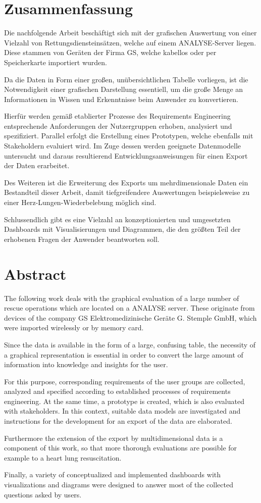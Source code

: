 \newpage\thispagestyle{empty}
\section*{Zusammenfassung}

Die nachfolgende Arbeit beschäftigt sich mit der grafischen Auswertung von einer Vielzahl von Rettungsdiensteinsätzen, welche auf einem \acrlong{ANALYSE}-Server liegen.
Diese stammen von Geräten der Firma \acrlong{GS}, welche kabellos oder per Speicherkarte importiert wurden.

Da die Daten in Form einer großen, unübersichtlichen Tabelle vorliegen, ist die Notwendigkeit einer grafischen Darstellung essentiell, um die große Menge an Informationen in Wissen und Erkenntnisse beim Anwender zu konvertieren.

Hierfür werden gemäß etablierter Prozesse des Requirements Engineering entsprechende Anforderungen der Nutzergruppen erhoben, analysiert und spezifiziert.
Parallel erfolgt die Erstellung eines Prototypen, welche ebenfalls mit Stakeholdern evaluiert wird.
Im Zuge dessen werden geeignete Datenmodelle untersucht und daraus resultierend Entwicklungsanweisungen für einen Export der Daten erarbeitet.

Des Weiteren ist die Erweiterung des Exports um mehrdimensionale Daten ein Bestandteil dieser Arbeit, damit tiefgreifendere Auswertungen beispielsweise zu einer Herz-Lungen-Wiederbelebung möglich sind.

Schlussendlich gibt es eine Vielzahl an konzeptionierten und umgesetzten Dashboards mit Visualisierungen und Diagrammen, die den größten Teil der erhobenen Fragen der Anwender beantworten soll.

\section*{Abstract}
The following work deals with the graphical evaluation of a large number of
rescue operations which are located on a \acrlong{ANALYSE} server.
These originate from devices of the company GS Elektromedizinische Geräte G. Stemple GmbH, which were imported wirelessly or by memory card.

Since the data is available in the form of a large, confusing table, the necessity of a graphical representation is essential in order to convert the large amount of information into knowledge and insights for the user.

For this purpose, corresponding requirements of the user groups are collected, analyzed and specified according to established processes of requirements engineering.
At the same time, a prototype is created, which is also evaluated with stakeholders.
In this context, suitable data models are investigated and instructions for the development for an export of the data are elaborated.

Furthermore the extension of the export by multidimensional data is a component of this work, so that more thorough evaluations are possible for example to a heart lung resuscitation.

Finally, a variety of conceptualized and implemented dashboards with visualizations and diagrams were designed to answer most of the collected questions asked by users.

\newpage